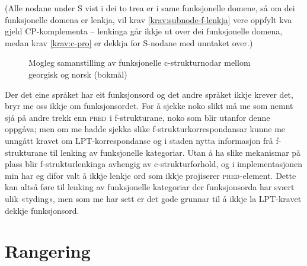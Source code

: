 \documentclass[12pt,a4paper,oneside,draft]{report}
\newcommand{\F}[2]{\textsc{#1}\ensuremath{_{#2}}}
\newcommand{\PRED}{\F{pred}{}}
\begin{document}
(Alle nodane under S vist i dei to trea er i same funksjonelle domene,
 så om dei funksjonelle domena er lenkja, vil krav
 \ref{krav:subnode-f-lenkja} vere oppfylt kva gjeld CP-komplementa --
 lenkinga går ikkje ut over dei funksjonelle domena, medan krav
 \ref{krav:c-pro} er dekkja for S-nodane med unntaket over.)

  \begin{figure}[htp]
   \centering
  
  \caption{Mogleg samanstilling av funksjonelle c\hyp{}strukturnodar mellom georgisk og norsk (bokmål)}
   \label{fig:fnord}
  \end{figure}

Der det eine språket har eit funksjonsord og det andre språket ikkje
 krever det, bryr me oss ikkje om funksjonsordet. For å sjekke noko
 slikt må me som nemnt sjå på andre trekk enn \PRED{} i
 f\hyp{}strukturane, noko som blir utanfor denne oppgåva; men om me
 hadde sjekka slike f\hyp{}strukturkorrespondansar kunne me unngått
 kravet om LPT\hyp{}korrespondanse og i staden nytta informasjon frå
 f\hyp{}strukturane til lenking av funksjonelle kategoriar. Utan å ha
 slike mekanismar på plass blir f\hyp{}strukturlenkinga avhengig av
 c\hyp{}strukturforhold, og i implementasjonen min har eg difor valt å
 ikkje lenkje ord som ikkje projiserer \PRED{}-element. Dette kan
 altså føre til lenking av funksjonelle kategoriar der funksjonsorda
 har svært ulik «tyding», men som me har sett er det gode grunnar til
 å ikkje la LPT-kravet dekkje funksjonsord.

\section{Rangering}
\label{sec-3.8}
\end{document}
